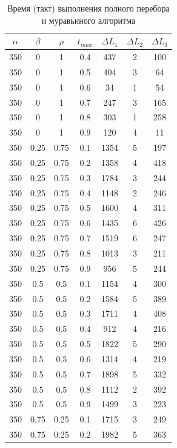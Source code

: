 \documentclass[a4paper,oneside,14pt]{extreport}
\begin{document}
\begin{table}[h]
\caption{Время (такт) выполнения полного перебора и муравьиного алгоритма}
\label{tbl:only}
\begin{center}
	\begin{tabular}{|c|c|c|c|c|c|c|}
		\hline
		$\alpha$ & $\beta$ & $\rho$ &  $t_{max}$ & $\Delta L_{1}$ & $\Delta L_{2}$ & $\Delta L_{3}$\\
		\hline
		350 & 0 & 1 & 0.4 & 437 & 2 & 100 \\
		350 & 0 & 1 & 0.5 & 404 & 3 & 64 \\
		350 & 0 & 1 & 0.6 & 34 & 1 & 54 \\
		350 & 0 & 1 & 0.7 & 247 & 3 & 165 \\
		350 & 0 & 1 & 0.8 & 303 & 1 & 258 \\
		350 & 0 & 1 & 0.9 & 120 & 4 & 11 \\
		350 & 0.25 & 0.75 & 0.1 & 1354 & 5 & 197 \\
		350 & 0.25 & 0.75 & 0.2 & 1358 & 4 & 418 \\
		350 & 0.25 & 0.75 & 0.3 & 1784 & 3 & 244 \\
		350 & 0.25 & 0.75 & 0.4 & 1148 & 2 & 246 \\
		350 & 0.25 & 0.75 & 0.5 & 1600 & 4 & 311 \\
		350 & 0.25 & 0.75 & 0.6 & 1435 & 6 & 426 \\
		350 & 0.25 & 0.75 & 0.7 & 1519 & 6 & 247 \\
		350 & 0.25 & 0.75 & 0.8 & 1013 & 3 & 211 \\
		350 & 0.25 & 0.75 & 0.9 & 956 & 5 & 244 \\
		350 & 0.5 & 0.5 & 0.1 & 1154 & 4 & 300 \\
		350 & 0.5 & 0.5 & 0.2 & 1584 & 5 & 389 \\
		350 & 0.5 & 0.5 & 0.3 & 1711 & 4 & 408 \\
		350 & 0.5 & 0.5 & 0.4 & 912 & 4 & 216 \\
		350 & 0.5 & 0.5 & 0.5 & 1822 & 5 & 290 \\
		350 & 0.5 & 0.5 & 0.6 & 1314 & 4 & 219 \\
		350 & 0.5 & 0.5 & 0.7 & 1898 & 5 & 332 \\
		350 & 0.5 & 0.5 & 0.8 & 1112 & 2 & 392 \\
		350 & 0.5 & 0.5 & 0.9 & 1499 & 3 & 223 \\
		350 & 0.75 & 0.25 & 0.1 & 1715 & 3 & 249 \\
		350 & 0.75 & 0.25 & 0.2 & 1982 & 5 & 363 \\

\end{tabular}
\end{center}
\end{table}
\end{document}
